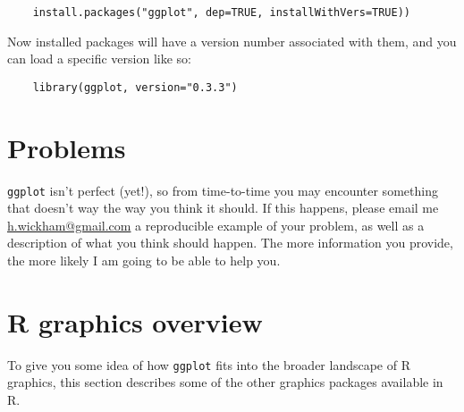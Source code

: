 \begin{verbatim}
	install.packages("ggplot", dep=TRUE, installWithVers=TRUE))
\end{verbatim}

Now installed packages will have a version number associated with them, and you can load a specific version like so:

\begin{verbatim}
	library(ggplot, version="0.3.3")
\end{verbatim}


\section{Problems}\label{sec:problems}

{\tt ggplot} isn't perfect (yet!), so from time-to-time you may encounter something that doesn't way the way you think it should.  If this happens, please email me \href{mailto:h.wickham@gmail.com}{h.wickham@gmail.com} a reproducible example of your problem, as well as a description of what you think should happen.  The more information you provide, the more likely I am going to be able to help you.

\section{R graphics overview}

To give you some idea of how {\tt ggplot} fits into the broader landscape of R graphics, this section describes some of the other graphics packages available in R.

